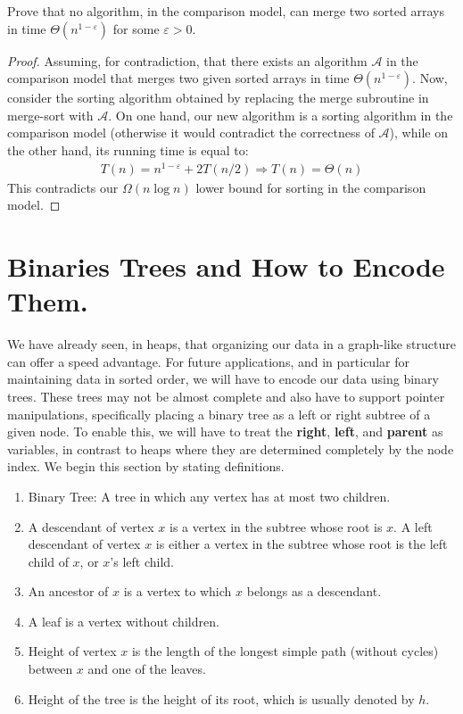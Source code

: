 \begin{example}
  Prove that no algorithm, in the comparison model, can merge two sorted arrays in time $\Theta(n^{1-\varepsilon})$ for some $\varepsilon>0$.
\end{example}
\begin{proof}
 Assuming, for contradiction, that there exists an algorithm $\mathcal{A}$ in the comparison model that merges two given sorted arrays in time $\Theta\left( n^{1-\varepsilon} \right)$. Now, consider the sorting algorithm obtained by replacing the merge subroutine in merge-sort with $\mathcal{A}$. On one hand, our new algorithm is a sorting algorithm in the comparison model (otherwise it would contradict the correctness of $\mathcal{A}$), while on the other hand, its running time is equal to:
  \begin{equation*}
    \begin{split}
      T(n) = n^{1-\varepsilon} + 2T(n/2) \Rightarrow T(n) = \Theta(n)
    \end{split}
  \end{equation*}
  This contradicts our $\Omega(n\log n)$ lower bound for sorting in the comparison model.
\end{proof}


\section{Binaries Trees and How to Encode Them.} We have already seen, in heaps, that organizing our data in a graph-like structure can offer a speed advantage. For future applications, and in particular for maintaining data in sorted order, we will have to encode our data using binary trees. These trees may not be almost complete and also have to support pointer manipulations, specifically placing a binary tree as a left or right subtree of a given node. To enable this, we will have to treat the \textbf{right}, \textbf{left}, and \textbf{parent} as variables, in contrast to heaps where they are determined completely by the node index. We begin this section by stating definitions.


\begin{definition}
  \begin{enumerate}
    \item Binary Tree: A tree in which any vertex has at most two children.
    \item A descendant of vertex $x$ is a vertex in the subtree whose root is $x$. A left descendant of vertex $x$ is either a vertex in the subtree whose root is the left child of $x$, or $x$'s left child.
    \item An ancestor of $x$ is a vertex to which $x$ belongs as a descendant.
    \item A leaf is a vertex without children.
    \item Height of vertex $x$ is the length of the longest simple path (without cycles) between $x$ and one of the leaves.
    \item Height of the tree is the height of its root, which is usually denoted by $h$.
\end{enumerate}
\end{definition}

